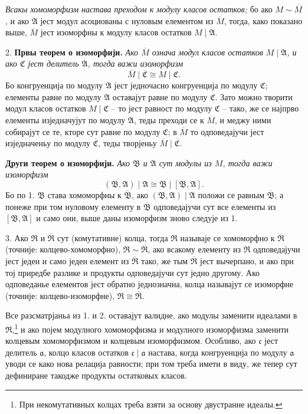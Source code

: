 \documentclass[11pt]{article}
\providecommand{\mR}{\mathfrak{R}}
\providecommand{\mA}{\mathfrak{A}}
\providecommand{\mB}{\mathfrak{B}}
\providecommand{\mC}{\mathfrak{C}}
\providecommand{\ma}{\mathfrak{a}}
\providecommand{\mc}{\mathfrak{c}}
\begin{document}
\emph{Всакы хомоморфизм настава преходом к модулу класов остатков;} бо ако $M\sim\overline M$, и ако $\mA$ јест модул асоциованы с нуловым елементом из $\overline M$, тогда, како показано выше, $\overline M$ јест изоморфны к модулу класов остатков $M\mid\mA$.

2. \textbf{Првы теорем о изоморфији.} \emph{Ако $\overline M$ означа модул класов остатков $M\mid\mA$, и ако $\mC$ јест делитель $\mA$, тогда важи изоморфизм
\[
\overline M\mid\overline{\mC}\cong M\mid\mC .
\]}
Бо конгруенција по модулу $\mA$ јест једночасно конгруенција по модулу $\mC$; елементы равне по модулу $\mA$ оставајут равне по модулу $\mC$. Зато можно творити модул класов остатков $M\mid\mC$ -- то јест равност по модулу $\mC$ -- тако, же се најпрво елементы изједначујут по модулу $\mA$, теды преходи се к $\overline M$, и меджу ними собирајут се те, кторе сут равне по модулу $\mC$; в $\overline M$ то одповедајучи јест изједначеньу по модулу $\overline{\mC}$, теды творјеньу $\overline M\mid\overline{\mC}$.

\textbf{Други теорем о изоморфији.} \emph{Ако $\mB$ и $\mA$ сут модулы из $M$, тогда важи изоморфизм
\[
(\mB,\mA)\mid\mA\cong \mB\mid[\mB,\mA].
\]}
Бо по 1. $\mB$ става хомоморфны к $\overline{\mB}$, ако $(\mB,\mA)\mid\mA$ положи се равным $\overline{\mB}$; а понеже при том нуловому елементу в $\overline{\mB}$ одповедајучи сут все елементы из $[\mB,\mA]$ и само они, выше даны изоморфизм зново следује из 1.

3. Ако $\mR$ и $\overline{\mR}$ сут (комутативне) колца, тогда $\mR$ называје се хомоморфно к $\overline{\mR}$ (точније: колцево-хомоморфно), $\mR\sim\overline{\mR}$, ако всакому елементу из $\mR$ одповедајучи јест једен и само једен елемент из $\overline{\mR}$ тако, же тым $\overline{\mR}$ јест вычерпано, и ако при тој приредбе разлике и продукты одповедајучи сут једно другому. Ако одповеданье елементов јест обратно једнозначна, колца называјут се изоморфне (точније: колцево-изоморфне), $\mR\cong\overline{\mR}$.

Все разсматрјаньа из 1. и 2. оставајут валидне, ако модулы заменити идеалами в $\mR$,\footnote{При некомутативных колцах треба взяти за основу двустранне идеалы.} и ако појем модулного хомоморфизма и модулного изоморфизма заменити колцевым хомоморфизмом и колцевым изоморфизмом. Особливо, ако $\mc$ јест делитель $\ma$, колцо класов остатков $\mc\mid\ma$ настава, когда конгруенција по модулу $\ma$ уводи се како нова релација равности; при том треба имети в виду, же тепер сут дефиниране такодже продукты остатковых класов.
\end{document}
